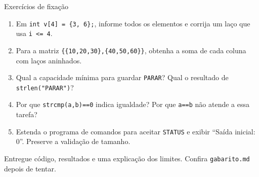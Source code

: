 \begin{frame}{Exercícios de fixação}
\begin{enumerate}
\item Em \texttt{int v[4] = \{3, 6\};}, informe todos os elementos e corrija um laço que usa \texttt{i <= 4}.
\item Para a matriz \texttt{\{\{10,20,30\},\{40,50,60\}\}}, obtenha a soma de cada coluna com laços aninhados.
\item Qual a capacidade mínima para guardar \texttt{PARAR}? Qual o resultado de \texttt{strlen("PARAR")}?
\item Por que \texttt{strcmp(a,b)==0} indica igualdade? Por que \texttt{a==b} não atende a essa tarefa?
\item Estenda o programa de comandos para aceitar \texttt{STATUS} e exibir ``Saída inicial: 0''. Preserve a validação de tamanho.
\end{enumerate}
\small Entregue código, resultados e uma explicação dos limites. Confira \texttt{gabarito.md} depois de tentar.
\end{frame}
